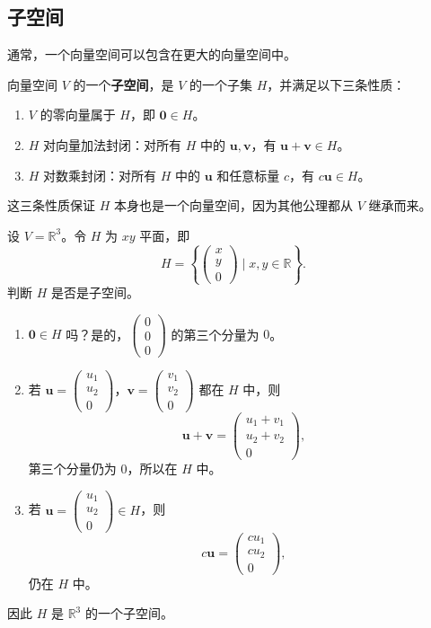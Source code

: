 \subsection{子空间}
通常，一个向量空间可以包含在更大的向量空间中。

\begin{definition}
向量空间 $V$ 的一个\textbf{子空间}，是 $V$ 的一个子集 $H$，并满足以下三条性质：
\begin{enumerate}
    \item $V$ 的零向量属于 $H$，即 $\mathbf{0}\in H$。
    \item $H$ 对向量加法封闭：对所有 $H$ 中的 $\mathbf{u},\mathbf{v}$，有 $\mathbf{u}+\mathbf{v}\in H$。
    \item $H$ 对数乘封闭：对所有 $H$ 中的 $\mathbf{u}$ 和任意标量 $c$，有 $c\mathbf{u}\in H$。
\end{enumerate}
这三条性质保证 $H$ 本身也是一个向量空间，因为其他公理都从 $V$ 继承而来。
\end{definition}

\begin{example}[一个子空间]
设 $V=\mathbb{R}^3$。令 $H$ 为 $xy$ 平面，即
\[
H=\left\{\begin{pmatrix}x\\y\\0\end{pmatrix}\mid x,y\in\mathbb{R}\right\}.
\]
判断 $H$ 是否是子空间。
\begin{enumerate}
    \item $\mathbf{0}\in H$ 吗？是的，$\begin{pmatrix}0\\0\\0\end{pmatrix}$ 的第三个分量为 $0$。
    \item 若 $\mathbf{u}=\begin{pmatrix}u_1\\u_2\\0\end{pmatrix}$，$\mathbf{v}=\begin{pmatrix}v_1\\v_2\\0\end{pmatrix}$ 都在 $H$ 中，则
    \[
    \mathbf{u}+\mathbf{v}=\begin{pmatrix}u_1+v_1\\u_2+v_2\\0\end{pmatrix},
    \]
    第三个分量仍为 $0$，所以在 $H$ 中。
    \item 若 $\mathbf{u}=\begin{pmatrix}u_1\\u_2\\0\end{pmatrix}\in H$，则
    \[
    c\mathbf{u}=\begin{pmatrix}cu_1\\cu_2\\0\end{pmatrix},
    \]
    仍在 $H$ 中。
\end{enumerate}
因此 $H$ 是 $\mathbb{R}^3$ 的一个子空间。
\end{example}

